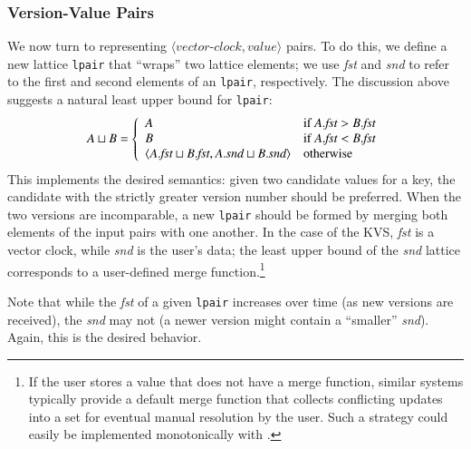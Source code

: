 \subsubsection{Version-Value Pairs}
We now turn to representing $\langle\textit{vector-clock},\textit{value}\rangle$
pairs. To do this, we define a new lattice \texttt{lpair} that ``wraps'' two
lattice elements; we use \emph{fst} and \emph{snd} to refer to the first and
second elements of an \texttt{lpair}, respectively. The discussion above
suggests a natural least upper bound for \texttt{lpair}:
\begin{displaymath}
  A \sqcup B = \left\{
    \begin{array}{l l}
      A & \textrm{if } A.\textit{fst} > B.\textit{fst} \\
      B & \textrm{if } A.\textit{fst} < B.\textit{fst} \\
      \langle A.\textit{fst} \sqcup B.\textit{fst}, A.\textit{snd} \sqcup B.\textit{snd}\rangle & \textrm{otherwise} \\
    \end{array} \right. 
\end{displaymath}
This implements the desired semantics: given two candidate values for a key, the
candidate with the strictly greater version number should be preferred. When the
two versions are incomparable, a new \texttt{lpair} should be formed by merging
both elements of the input pairs with one another. In the case of the KVS,
\emph{fst} is a vector clock, while \emph{snd} is the user's data; the least
upper bound of the \emph{snd} lattice corresponds to a user-defined merge
function.\footnote{If the user stores a value that does not have a merge
  function, similar systems typically provide a default merge function that
  collects conflicting updates into a set for eventual manual resolution by the user. Such
  a strategy could easily be implemented monotonically with \lang.}

Note that while the \emph{fst} of a given \texttt{lpair} increases over time (as
new versions are received), the \emph{snd} may not (a newer version might
contain a ``smaller'' \emph{snd}). Again, this is the desired behavior.

